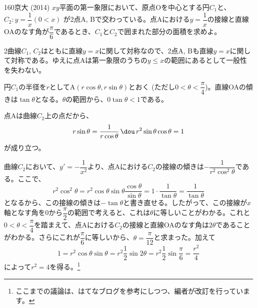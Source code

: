 \begin{thm}{160}{}{京大 (2014)}
 $xy$平面の第一象限において、原点Oを中心とする円$C_1$と、$C_2: y=\dfrac{1}{x} (0<x)$ が2点A, Bで交わっている。点Aにおける$y=\dfrac{1}{x}$の接線と直線OAのなす角が$\dfrac{\pi}{6}$であるとき、$C_1$と$C_2$で囲まれた部分の面積を求めよ。
\end{thm}

2曲線$C_1$, $C_2$はともに直線$y=x$に関して対称なので、2点A, Bも直線$y=x$に関して対称である。ゆえに点Aは第一象限のうちの$y\le x$の範囲にあるとして一般性を失わない。

円$C_1$の半径を$r$としてA$(r\cos\theta, r\sin\theta)$とおく (ただし$0<\theta<\dfrac{\pi}{4}$)。直線OAの傾きは$\tan\theta$となる。$\theta$の範囲から、$0\tan\theta<1$である。

点Aは曲線$C_2$上の点だから、
\[ r\sin\theta=\frac{1}{r\cos\theta} \,\dou\, r^2\sin\theta\cos\theta=1 \]
が成り立つ。

曲線$C_2$において、$y'=-\dfrac{1}{x^2}$より、点Aにおける$C_2$の接線の傾きは$-\dfrac{1}{r^2\cos^2\theta}$である。ここで、
\[ r^2\cos^2\theta=r^2\cos\theta\sin\theta\frac{\cos\theta}{\sin\theta}=1\cdot\frac{1}{\tan\theta}=\frac{1}{\tan\theta} \]
となるから、この接線の傾きは$-\tan\theta$と書き直せる。したがって、この接線が$x$軸となす角を0から$\dfrac{\pi}{2}$の範囲で考えると、これは$\theta$に等しいことがわかる。これと$0<\theta<\dfrac{\pi}{4}$を踏まえて、点Aにおける$C_2$の接線と直線OAのなす角は$2\theta$であることがわかる。さらにこれが$\dfrac{\pi}{6}$に等しいから、$\theta=\dfrac{\pi}{12}$と求まった。加えて
\[ 1=r^2\cos\theta\sin\theta=r^2\frac{1}{2}\sin2\theta=r^2\frac{1}{2}\sin\frac{\pi}{6}=\frac{r^2}{4} \]
によって$r^2=4$を得る。\footnote{ここまでの議論は、はてなブログを参考にしつつ、編者が改訂を行っています。}


